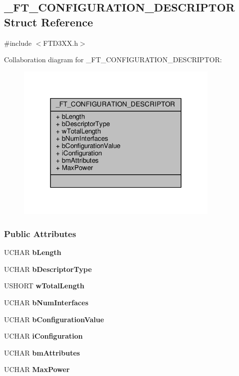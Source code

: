 \subsection{\+\_\+\+F\+T\+\_\+\+C\+O\+N\+F\+I\+G\+U\+R\+A\+T\+I\+O\+N\+\_\+\+D\+E\+S\+C\+R\+I\+P\+T\+OR Struct Reference}
\label{struct__FT__CONFIGURATION__DESCRIPTOR}


{\ttfamily \#include $<$F\+T\+D3\+X\+X.\+h$>$}



Collaboration diagram for \+\_\+\+F\+T\+\_\+\+C\+O\+N\+F\+I\+G\+U\+R\+A\+T\+I\+O\+N\+\_\+\+D\+E\+S\+C\+R\+I\+P\+T\+OR\+:
\nopagebreak
\begin{figure}[H]
\begin{center}
\leavevmode
\includegraphics[width=276pt]{d2/df6/struct__FT__CONFIGURATION__DESCRIPTOR__coll__graph}
\end{center}
\end{figure}
\subsubsection*{Public Attributes}
\begin{DoxyCompactItemize}
\item 
U\+C\+H\+AR {\bf b\+Length}
\item 
U\+C\+H\+AR {\bf b\+Descriptor\+Type}
\item 
U\+S\+H\+O\+RT {\bf w\+Total\+Length}
\item 
U\+C\+H\+AR {\bf b\+Num\+Interfaces}
\item 
U\+C\+H\+AR {\bf b\+Configuration\+Value}
\item 
U\+C\+H\+AR {\bf i\+Configuration}
\item 
U\+C\+H\+AR {\bf bm\+Attributes}
\item 
U\+C\+H\+AR {\bf Max\+Power}
\end{DoxyCompactItemize}



